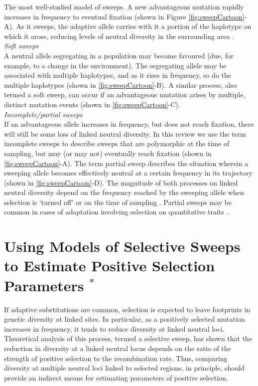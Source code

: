 The most well-studied model of sweeps. A new advantageous mutation rapidly increases in frequency to eventual fixation (shown in Figure \ref{fig:sweepCartoon}-A). As it sweeps, the adaptive allele carries with it a portion of the haplotype on which it arose, reducing levels of neutral diversity in the surrounding area \citep{RN124,RN235}. \\
 
\emph{Soft sweeps} \\
  
A neutral allele segregating in a population may become favoured (due, for example, to a change in the environment). The segregating allele may be associated with multiple haplotypes, and as it rises in frequency, so do the multiple haplotypes (shown in \ref{fig:sweepCartoon}-B). A similar process, also termed a soft sweep, can occur if an advantageous mutation arises by multiple, distinct mutation events (shown in \ref{fig:sweepCartoon}-C). \\
 
\emph{Incomplete/partial sweeps} \\
 
If an advantageous allele increases in frequency, but does not reach fixation, there will still be some loss of linked neutral diversity. In this review we use the term incomplete sweeps to describe sweeps that are polymorphic at the time of sampling, but may (or may not) eventually reach fixation (shown in \ref{fig:sweepCartoon}-A). The term partial sweep describes the situation wherein a sweeping allele becomes effectively neutral at a certain frequency in its trajectory (shown in \ref{fig:sweepCartoon}-D). The magnitude of both processes on linked neutral diversity depend on the frequency reached by the sweeping allele when selection is ‘turned off’ or on the time of sampling \citep{RN226}. Partial sweeps may be common in cases of adaptation involving selection on quantitative traits \citep{RN147}. \\

\section[Using Models of Selective Sweeps to Estimate Positive Selection Parameters]{Using Models of Selective Sweeps to Estimate Positive Selection Parameters $^*$}
 
If adaptive substitutions are common, selection is expected to leave footprints in genetic diversity at linked sites. In particular, as a positively selected mutation increases in frequency, it tends to reduce diversity at linked neutral loci. Theoretical analysis of this process, termed a selective sweep, has shown that the reduction in diversity at a linked neutral locus depends on the ratio of the strength of positive selection to the recombination rate. Thus, comparing diversity at multiple neutral loci linked to selected regions, in principle, should provide an indirect means for estimating parameters of positive selection.
 

